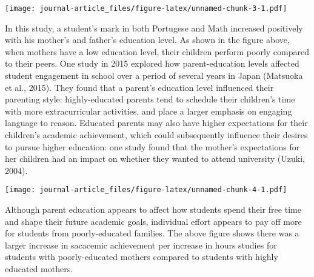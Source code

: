 \documentclass[
]{article}
\newenvironment{Shaded}{\begin{snugshade}}{\end{snugshade}}
\newcommand{\DataTypeTok}[1]{\textcolor[rgb]{0.13,0.29,0.53}{#1}}
\newcommand{\DecValTok}[1]{\textcolor[rgb]{0.00,0.00,0.81}{#1}}
\newcommand{\KeywordTok}[1]{\textcolor[rgb]{0.13,0.29,0.53}{\textbf{#1}}}
\newcommand{\NormalTok}[1]{#1}
\newcommand{\OperatorTok}[1]{\textcolor[rgb]{0.81,0.36,0.00}{\textbf{#1}}}
\newcommand{\StringTok}[1]{\textcolor[rgb]{0.31,0.60,0.02}{#1}}
\begin{document}
\texttt{[image: journal-article\_files/figure-latex/unnamed-chunk-3-1.pdf]}

In this study, a student's mark in both Portugese and Math increased
positively with his mother's and father's education level. As shown in
the figure above, when mothers have a low education level, their
children perform poorly compared to their peers. One study in 2015
explored how parent-education levels affected student engagement in
school over a period of several years in Japan (Matsuoka et al., 2015).
They found that a parent's education level influenced their parenting
style: highly-educated parents tend to schedule their children's time
with more extracurricular activities, and place a larger emphasis on
engaging language to reason. Educated parents may also have higher
expectations for their children's academic achievement, which could
subsequently influence their desires to pursue higher education: one
study found that the mother's expectations for her children had an
impact on whether they wanted to attend university (Uzuki, 2004).

\begin{Shaded}
\end{Shaded}

\texttt{[image: journal-article\_files/figure-latex/unnamed-chunk-4-1.pdf]}

Although parent education appears to affect how students spend their
free time and shape their future academic goals, individual effort
appears to pay off more for students from poorly-educated families. The
above figure shows there was a larger increase in sacacemic achievement
per increase in hours studies for students with poorly-educated mothers
compared to students with highly educated mothers.
\end{document}
